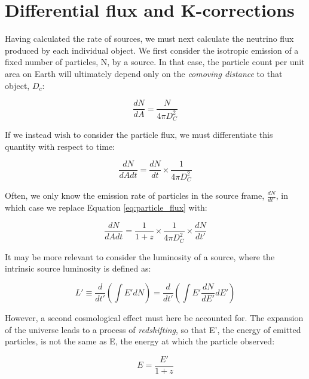 \section{Differential flux and K-corrections}

Having  calculated the rate of sources, we must next calculate the neutrino flux produced by each individual object. We first consider the isotropic emission of a fixed number of particles, N, by a source. In that case, the particle count per unit area on Earth will ultimately depend only on the \emph{comoving distance} to that object, $D_{c}$:

\begin{equation}
\frac{dN}{dA} = \frac{N}{4 \pi D_{C}^{2}}
\label{eq:particle_per_area}
\end{equation}

If we instead wish to consider the particle flux, we must differentiate this quantity with respect to time:

\begin{equation}
\frac{dN}{dAdt} = \frac{dN}{dt} \times \frac{1}{4 \pi D_{C}^{2}}
\label{eq:particle_flux}
\end{equation}

Often, we only know the emission rate of particles in the source frame, $\frac{dN}{dt'}$, in which case we replace Equation \ref{eq:particle_flux} with:

\begin{equation}
\frac{dN}{dAdt} = \frac{1}{1+z} \times \frac{1}{4 \pi D_{C}^{2}} \times \frac{dN}{dt'}
\label{eq:alt_particle_flux}
\end{equation}

It may be more relevant to consider the luminosity of a source, where the intrinsic source luminosity is defined as:

\begin{equation}
L' \equiv \frac{d}{dt'} \left( \int E' dN \right) = \frac{d}{dt'} \left( \int E' \frac{dN}{dE'} dE' \right)
\end{equation}

However, a second cosmological effect must here be accounted for. The expansion of the universe leads to a process of \emph{redshifting}, so that E', the energy of emitted particles, is not the same as E, the energy at which the particle observed:

\begin{equation}
E = \frac{E'}{1+z}
\label{eq:redshift}
\end{equation}

